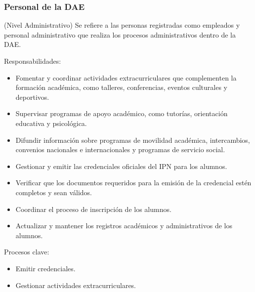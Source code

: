\begin{Usuario}{\hypertarget{tPersonalDAE}{\subsubsection{Personal de la DAE}}}{(Nivel Administrativo)}{
        Se refiere a las personas registradas como empleados y personal administrativo que realiza los procesos administrativos dentro de la DAE.
    }
    \item[Responsabilidades:] \cdtEmpty
    \begin{itemize}
        \item Fomentar y coordinar actividades extracurriculares que complementen la formación académica, como talleres, conferencias, eventos culturales y deportivos.
        \item Supervisar programas de apoyo académico, como tutorías, orientación educativa y psicológica.
        \item Difundir información sobre programas de movilidad académica, intercambios, convenios nacionales e internacionales y programas de servicio social.
        \item Gestionar y emitir las credenciales oficiales del IPN para los alumnos.
        \item Verificar que los documentos requeridos para la emisión de la credencial estén completos y sean válidos.
        \item Coordinar el proceso de inscripción de los alumnos.
        \item Actualizar y mantener los registros académicos y administrativos de los alumnos.
    \end{itemize}
    \item[Procesos clave:] \cdtEmpty
    \begin{itemize}
         \item Emitir credenciales.
         \item Gestionar actividades extracurriculares.
    \end{itemize}
\end{Usuario}

